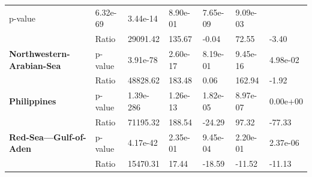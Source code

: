 \begin{table}[H]
{\begin{tabular}{lllllll}
            p-value                                             &
            6.32e-69                                            &
            3.44e-14                                            &
            8.90e-01                                            &
            7.65e-09                                            &
            9.09e-03
            \\
            \textbf{}                                           & Ratio    &
            29091.42                                            & 135.67   &
            -0.04
                                                                & 72.55    &
            -3.40
            \\
            \textbf{Northwestern-Arabian-Sea}                   & p-value  &
            3.91e-78                                            & 2.60e-17 &
            8.19e-01                                            & 9.45e-16 &
            4.98e-02
            \\
            \textbf{}                                           & Ratio    &
            48828.62                                            & 183.48   &
            0.06
                                                                & 162.94   &
            -1.92
            \\
            \textbf{Philippines}                                & p-value  &
            1.39e-286                                           & 1.26e-13 &
            1.82e-05                                            & 8.97e-07 &
            0.00e+00
            \\
            \textbf{}                                           & Ratio    &
            71195.32                                            & 188.54   &
            -24.29
                                                                & 97.32    &
            -77.33
            \\
            \textbf{Red-Sea---Gulf-of-Aden}                     & p-value  &
            4.17e-42                                            & 2.35e-01 &
            9.45e-04                                            & 2.20e-01 &
            2.37e-06
            \\
            \textbf{}                                           & Ratio    &
            15470.31                                            & 17.44    &
            -18.59
                                                                & -11.52   &
            -11.13
            \\

\end{tabular}}
\end{table}
